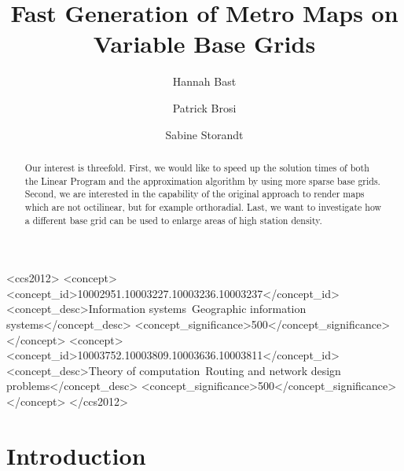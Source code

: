 \documentclass[sigconf]{acmart}
\begin{document}
\title{Fast Generation of Metro Maps on Variable Base Grids}

\author{Hannah Bast}

\author{Patrick Brosi}

\author{Sabine Storandt}

\begin{abstract}
Our interest is threefold. First, we would like to speed up the solution times of both the Linear Program and the approximation algorithm by using more sparse base grids. Second, we are interested in the capability of the original approach to render maps which are not octilinear, but for example orthoradial. Last, we want to investigate how a different base grid can be used to enlarge areas of high station density. 
\end{abstract}

%
%
\begin{CCSXML}
<ccs2012>
<concept>
<concept_id>10002951.10003227.10003236.10003237</concept_id>
<concept_desc>Information systems~Geographic information systems</concept_desc>
<concept_significance>500</concept_significance>
</concept>
<concept>
<concept_id>10003752.10003809.10003636.10003811</concept_id>
<concept_desc>Theory of computation~Routing and network design problems</concept_desc>
<concept_significance>500</concept_significance>
</concept>
</ccs2012>
\end{CCSXML}



\maketitle

\section{Introduction}
\end{document}
